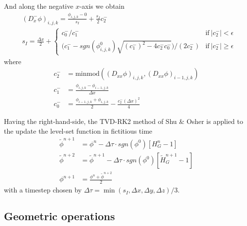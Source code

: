 \documentclass{elsarticle}
\begin{document}
And along the negative $x$-axis we obtain
\begin{align*}
 &(D_x^-\phi)_{i,j,k} = \frac{\phi_{i,j,k} - 0}{s_I} + \frac{s_I}{2} c_2^-\\
 & s_I = \frac{\Delta x}{2} + \left\{
 \begin{array}{ll}
 	c_0^-/c_1^-    & \textrm{if} \ \vert c_2^-\vert<\epsilon \\
 	\bigg(c_1^- - sgn(\phi^0_{i,j,k})\sqrt{(c_1^-)^2 - 4c_2^- c_0^-} \bigg)/(2 c_2^-)    & \textrm{if} \ \vert c_2^-\vert\ge \epsilon 
 \end{array}
\right.
\end{align*}
where 
\begin{align*}
	c_2^- &= \textrm{minmod}((D_{xx}\phi)_{i,j,k}, (D_{xx}\phi)_{i-1,j,k}) \\
	c_1^- &= \frac{\phi_{i,j,k} - \phi_{i-1,j,k}}{\Delta x} \\
	c_0^- &= \frac{\phi_{i-1,j,k} + \phi_{i,j,k}}{2} - \frac{c_2^- (\Delta x)^2}{4}
\end{align*}


Having the right-hand-side, the TVD-RK2 method of Shu \& Osher \cite{shu1988efficient} is applied to the update the level-set function in fictitious time
\begin{align*}
	\tilde{\phi}^{n+1}&=\phi^n - \Delta \tau \cdot sgn(\phi^0) [ H_G^n -1] \\
	\tilde{\phi}^{n+2}&=\tilde{\phi}^{n+1} - \Delta \tau \cdot sgn(\phi^0) [ \tilde{H}_G^{n+1} -1] \\
	\phi^{n+1}&=\frac{\phi^n + \tilde{\phi}^{n+2}}{2}
\end{align*}
with a timestep chosen by $\Delta \tau = \min (s_I, \Delta x, \Delta y, \Delta z) / 3$.

\subsection{Geometric operations}
\end{document}
